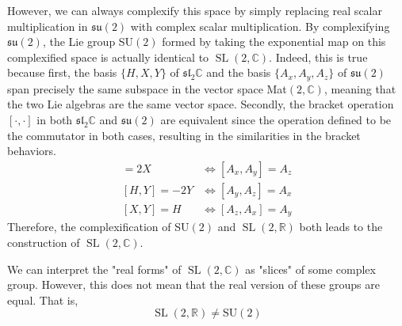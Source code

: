\documentclass{article}
\DeclareMathOperator{\SL}{SL}
\theoremstyle{remark}
\theoremstyle{definition}
\begin{document}
However, we can always complexify this space by simply replacing real scalar multiplication in $\mathfrak{su}(2)$ with complex scalar multiplication. By complexifying $\mathfrak{su}(2)$, the Lie group SU$(2)$ formed by taking the exponential map on this complexified space is actually identical to $\SL(2, \mathbb{C})$. Indeed, this is true because first, the basis $\{H, X, Y\}$ of $\mathfrak{sl}_2 \mathbb{C}$ and the basis $\{A_x, A_y, A_z\}$ of $\mathfrak{su}(2)$ span precisely the same subspace in the vector space Mat$(2, \mathbb{C})$, meaning that the two Lie algebras are the same vector space. Secondly, the bracket operation $[\cdot, \cdot]$ in both $\mathfrak{sl}_2 \mathbb{C}$ and $\mathfrak{su}(2)$ are equivalent since the operation defined to be the commutator in both cases, resulting in the similarities in the bracket behaviors. 
\begin{align*}
    [H,X] = 2X & \iff [A_x, A_y] = A_z \\
    [H,Y] = - 2Y & \iff [A_y, A_z] = A_x\\
    [X,Y] = H & \iff  [A_z, A_x] = A_y 
\end{align*}
Therefore, the complexification of SU$(2)$ and $\SL(2, \mathbb{R})$ both leads to the construction of $\SL(2, \mathbb{C})$. 
\begin{center}
\end{center}
We can interpret the "real forms" of $\SL(2, \mathbb{C})$ as "slices" of some complex group. However, this does not mean that the real version of these groups are equal. That is, 
\[\SL(2, \mathbb{R}) \neq \text{SU}(2)\]
\end{document}
